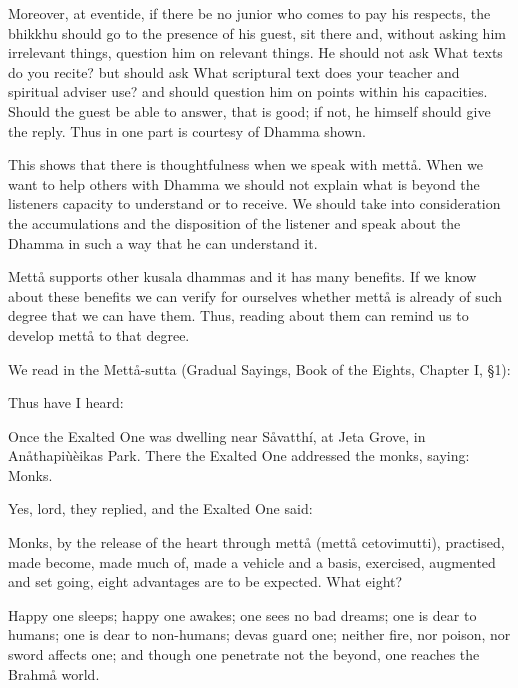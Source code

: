 \documentclass[12pt,twoside]{article}
\begin{document}
\bigskip

Moreover, at eventide, if there be no junior who comes to pay his
respects, the bhikkhu should go to the presence of his guest, sit there
and, without asking him irrelevant things, question him on relevant
things. He should not ask {\textasciigrave}{\textasciigrave}What texts
do you recite? but should ask {\textasciigrave}{\textasciigrave}What
scriptural text does your teacher and spiritual adviser
use?{\textquotesingle}{\textquotesingle} and should question him on
points within his capacities. Should the guest be able to answer, that
is good; if not, he himself should give the reply. Thus in one part is
courtesy of Dhamma shown. 


\bigskip

This shows that there is thoughtfulness when we speak with mett{\aa}.
When we want to help others with Dhamma we should not explain what is
beyond the listeners capacity to understand or to receive. We should
take into consideration the accumulations and the disposition of the
listener and speak about the Dhamma in such a way that he can
understand it. 

Mett{\aa} supports other kusala dhammas and it has many benefits. If we
know about these benefits we can verify for ourselves whether mett{\aa}
is already of such degree that we can have them. Thus, reading about
them can remind us to develop mett{\aa} to that degree. 

We read in the
{\textasciigrave}{\textasciigrave}Mett{\aa}{}-sutta{\textquotesingle}{\textquotesingle}
(Gradual Sayings, Book of the Eights, Chapter I, {\S}1):


\bigskip

Thus have I heard:

Once the Exalted One was dwelling near S{\aa}vatth\'i, at Jeta Grove, in
An{\aa}thapi\`u\`eika{\textquotesingle}s Park. There the Exalted One
addressed the monks, saying:
{\textasciigrave}{\textasciigrave}Monks{\textquotesingle}{\textquotesingle}.


{\textasciigrave}{\textasciigrave}Yes, lord,
{\textquotesingle}{\textquotesingle} they replied, and the Exalted One
said:

Monks, by the release of the heart through mett{\aa} (mett{\aa}
cetovimutti), practised, made become, made much of, made a vehicle and
a basis, exercised, augmented and set going, eight advantages are to be
expected. What eight?

Happy one sleeps; happy one awakes; one sees no bad dreams; one is dear
to humans; one is dear to non{}-humans; devas guard one; neither fire,
nor poison, nor sword affects one; and though one penetrate not the
beyond, one reaches the Brahm{\aa} world. 
\end{document}
